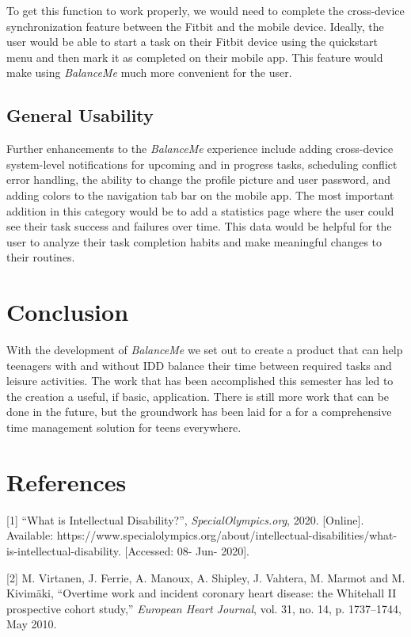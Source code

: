 \documentclass{sigchi}
\begin{document}
To get this function to work properly, we would need to complete the
cross-device synchronization feature between the Fitbit and the mobile device.
Ideally, the user would be able to start a task on their Fitbit device using
the quickstart menu and then mark it as completed on their mobile app. This
feature would make using \textit{BalanceMe} much more convenient for the user.

\subsection{General Usability}
Further enhancements to the \textit{BalanceMe} experience include adding
cross-device system-level notifications for upcoming and in progress tasks,
scheduling conflict error handling, the ability to change the profile picture
and user password, and adding colors to the navigation tab bar on the mobile
app. The most important addition in this category would be to add a statistics
page where the user could see their task success and failures over time. This
data would be helpful for the user to analyze their task completion habits and
make meaningful changes to their routines.


\section{Conclusion}

With the development of \textit{BalanceMe} we set out to create a product that
can help teenagers with and without IDD balance their time between required
tasks and leisure activities. The work that has been accomplished this semester
has led to the creation a useful, if basic, application. There is still more
work that can be done in the future, but the groundwork has been laid for a for
a comprehensive time management solution for teens everywhere.


\section{References}
[1] ``What is Intellectual Disability?'', \textit{SpecialOlympics.org}, 2020. [Online]. Available: https://www.specialolympics.org/about/intellectual-disabilities/what-is-intellectual-disability. [Accessed: 08- Jun- 2020].

[2] M. Virtanen, J. Ferrie, A. Manoux, A. Shipley, J. Vahtera, M. Marmot and M. Kivimäki, ``Overtime work and incident coronary heart disease: the Whitehall II prospective cohort study,'' \textit{European Heart Journal}, vol. 31, no. 14, p. 1737–1744, May 2010.
\end{document}
